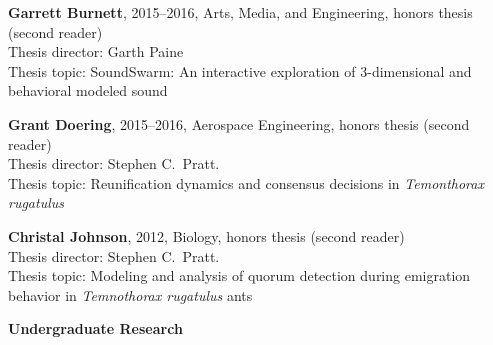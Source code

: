 \documentclass[10pt]{article}           %
\newcommand{\blankline}{\quad\pagebreak[3]}
\begin{document}
\begin{cvlist}[loose]
    \item \textbf{Garrett Burnett}, 2015--2016, Arts, Media, and Engineering, honors thesis (second reader)\\
        Thesis director: Garth Paine\\
        Thesis topic: SoundSwarm: An interactive exploration of
        3-dimensional and behavioral modeled sound

    \item \textbf{Grant Doering}, 2015--2016, Aerospace Engineering, honors thesis (second reader)\\
        Thesis director: Stephen C.~Pratt.\\
        Thesis topic: Reunification dynamics and consensus decisions in \emph{Temonthorax rugatulus}

    \item \textbf{Christal Johnson}, 2012, Biology, honors thesis (second reader)\\
        Thesis director: Stephen C.~Pratt.\\
        Thesis topic: Modeling and analysis of quorum detection during
        emigration behavior in \emph{Temnothorax rugatulus} ants

\end{cvlist}

\blankline

\textbf{Undergraduate Research}
\end{document}
